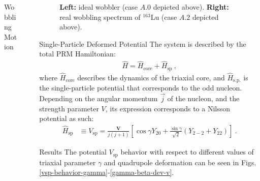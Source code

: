 \documentclass[final]{beamer}
\newlength{\sepwidth}
\newlength{\colwidth}
\newcommand{\separatorcolumn}{\begin{column}{\sepwidth}\end{column}}
\begin{document}
\begin{frame}[t]
\begin{columns}[t]
\begin{column}{\colwidth}
\begin{block}{Wobbling Motion}
\end{block}
\end{column}
\separatorcolumn
\begin{column}{\colwidth}
 \begin{figure}
\centering
\begin{minipage}{.5\textwidth}
  \centering
\end{minipage}%
\begin{minipage}{.5\textwidth}
  \centering
\end{minipage}
\caption{\textbf{Left:} ideal wobbler (case $A.0$ depicted above). \textbf{Right:} real wobbling spectrum of $^{163}$Lu (case $A.2$ depicted above).}
    \label{energy-function-min-point-evolution}
\end{figure}
  \begin{block}{Single-Particle Deformed Potential}
The system is described by the total PRM Hamiltonian:
\begin{align}
    \hat{H}=\hat{H}_\text{core}+\hat{H}_\text{sp}\ ,
\end{align}
where $\hat{H}_\text{core}$ describes the dynamics of the triaxial core, and $\hat{H}_\text{s.p.}$ is the single-particle potential that corresponds to the odd nucleon. Depending on the angular momentum $\vec{j}$ of the nucleon, and the strength parameter $V$, its expression corresponds to a Nilsson potential as such:
\begin{align}
\hat{H}_\text{sp}&\equiv V_\text{sp}=\frac{\mathbf{V}}{j(j+1)}\left[\cos\gamma Y_{20}+\frac{\sin\gamma}{\sqrt{2}}\left(Y_{2-2}+Y_{22}\right)\right]\ .
\end{align}
  \end{block}
    \begin{block}{Results}
  The potential $V_\text{sp}$ behavior with respect to different values of triaxial parameter $\gamma$ and quadrupole deformation can be seen in Figs. \ref{vsp-behavior-gamma}-\ref{gamma-beta-dev-v}.
   \begin{figure}
     \centering
     \begin{minipage}{.5\textwidth}
  \centering
\end{minipage}%
\begin{minipage}{.5\textwidth}

\end{minipage}
\end{figure}
\end{block}
\end{column}
\end{columns}
\end{frame}
\end{document}
